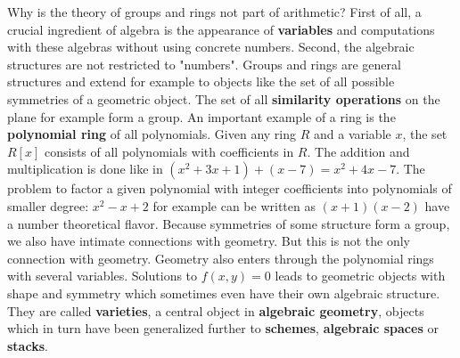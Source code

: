 \documentclass[12pt]{amsart}
\newcounter{example}    \def\example#1{ \item \fontsize{12}{15} \selectfont #1 \fontsize{12}{15} \selectfont }
\begin{document}
Why is the theory of groups and rings not part of arithmetic? 
First of all, a crucial ingredient of algebra is the appearance of {\bf variables} and 
computations with these algebras without using concrete numbers. Second,
the algebraic structures are not restricted to "numbers". 
Groups and rings are general structures and extend
for example to objects like the set of all possible symmetries of a geometric object. 
The set of all {\bf similarity operations} on the plane for 
example form a group. An important example of a ring is the {\bf polynomial ring} of all
polynomials. Given any ring $R$ and a variable $x$, the set $R[x]$ consists of all polynomials
with coefficients in $R$. The addition and multiplication is done like in 
$(x^2+3x+1) + (x-7) = x^2+4x-7$.
The problem to factor a given polynomial with integer coefficients into polynomials of 
smaller degree: $x^2-x+2$ for example can be written as $(x+1)(x-2)$ have a number 
theoretical flavor. Because symmetries of some structure form a group, we also have 
intimate connections with geometry. 
But this is not the only connection with geometry. Geometry also enters through the polynomial rings with 
several variables. Solutions to $f(x,y)=0$ leads to geometric objects with shape and 
symmetry which sometimes even have their own algebraic structure. 
They are called {\bf varieties}, a central object in {\bf algebraic geometry}, objects
which in turn have been generalized further to {\bf schemes}, 
{\bf algebraic spaces} or {\bf stacks}. \\
\end{document}
